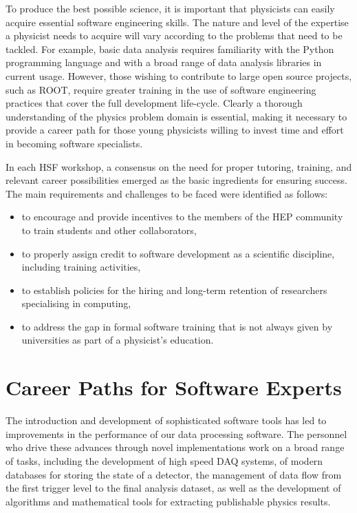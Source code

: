 \documentclass[12pt,a4paper]{article}
\begin{document}
To produce the best possible science, it is important that physicists can easily acquire
essential software engineering skills. The nature and level of the expertise a 
physicist needs to acquire will vary according to the problems that need to be tackled. 
For example, basic data analysis requires familiarity with the Python programming language 
and with a broad range of data analysis libraries in current usage. However, those 
wishing to contribute to large open source projects, such as ROOT, require greater 
training in the use of software engineering practices that cover the full development 
life-cycle. Clearly a thorough understanding of the physics problem domain is  
essential, making it necessary to provide a career path for those
young physicists willing to invest time and effort in becoming software specialists.

In each HSF workshop, a consensus on the need for proper tutoring, training,
and relevant career possibilities emerged as the basic ingredients for ensuring success.
The main requirements and challenges to be faced were identified as follows:

\begin{itemize}
    \item to encourage and provide incentives to the members of the HEP 
    community to train students and other collaborators,
    \item to properly assign credit to software development as a scientific 
    discipline, including training activities,
    \item to establish policies for the hiring and long-term retention of researchers 
    specialising in computing,
    \item to address the gap in formal software training that is not always 
    given by universities as part of a physicist's education.
\end{itemize}

\section{Career Paths for Software Experts}


The introduction and development of sophisticated software tools has led to
improvements in the performance of our data processing software. The
personnel who drive these advances through novel implementations work on a broad 
range of tasks, including the development of high speed DAQ systems, of modern databases for
storing the state of a detector, the management of data flow from the first trigger 
level to the final analysis dataset, as well as the development of algorithms and
mathematical tools for extracting publishable physics results.
\end{document}
